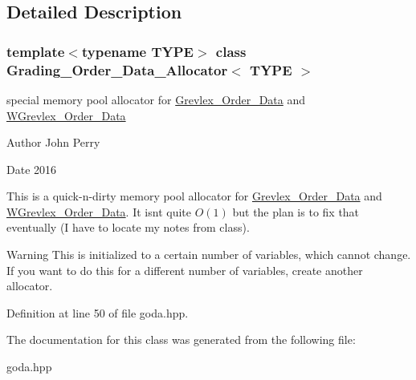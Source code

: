 \subsection{Detailed Description}
\subsubsection*{template$<$typename T\+Y\+PE$>$\newline
class Grading\+\_\+\+Order\+\_\+\+Data\+\_\+\+Allocator$<$ T\+Y\+P\+E $>$}

special memory pool allocator for \hyperlink{class_grevlex___order___data}{Grevlex\+\_\+\+Order\+\_\+\+Data} and \hyperlink{class_w_grevlex___order___data}{W\+Grevlex\+\_\+\+Order\+\_\+\+Data} 

\begin{DoxyAuthor}{Author}
John Perry 
\end{DoxyAuthor}
\begin{DoxyDate}{Date}
2016
\end{DoxyDate}
This is a quick-\/n-\/dirty memory pool allocator for \hyperlink{class_grevlex___order___data}{Grevlex\+\_\+\+Order\+\_\+\+Data} and \hyperlink{class_w_grevlex___order___data}{W\+Grevlex\+\_\+\+Order\+\_\+\+Data}. It isn\textquotesingle{}t quite $O(1)$ but the plan is to fix that eventually (I have to locate my notes from class). \begin{DoxyWarning}{Warning}
This is initialized to a certain number of variables, which cannot change. If you want to do this for a different number of variables, create another allocator. 
\end{DoxyWarning}


Definition at line 50 of file goda.\+hpp.



The documentation for this class was generated from the following file\+:\begin{DoxyCompactItemize}
\item 
goda.\+hpp\end{DoxyCompactItemize}
